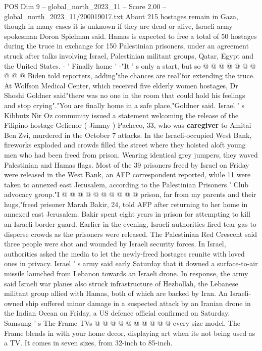 \begin{textsample}{POS Dim 9 – global\_north\_2023\_11 – Score 2.00 – global\_north\_2023\_11/200019017.txt}
About 215 hostages remain in Gaza, though in many cases it is unknown if they are dead or alive, Israeli army spokesman Doron Spielman said.
Hamas is expected to free a total of 50 hostages during the truce in exchange for 150 Palestinian prisoners, under an agreement struck after talks involving Israel, Palestinian militant groups, Qatar, Egypt and the United States. - ' Finally home ' -"It ' s only a start, but so @ @ @ @ @ @ @ @ @ @ Biden told reporters, adding"the chances are real"for extending the truce.
At Wolfson Medical Center, which received five elderly women hostages, Dr Shoshi Goldner said"there was no one in the room that could hold his feelings and stop crying"."You are finally home in a safe place,"Goldner said.
Israel ' s Kibbutz Nir Oz community issued a statement welcoming the release of the Filipino hostage Gelienor ( Jimmy ) Pacheco, 33, who was \textbf{caregiver} to Amitai Ben Zvi, murdered in the October 7 attacks.
In the Israeli-occupied West Bank, fireworks exploded and crowds filled the street where they hoisted aloft young men who had been freed from prison.
Wearing identical grey jumpers, they waved Palestinian and Hamas flags.
Most of the 39 prisoners freed by Israel on Friday were released in the West Bank, an AFP correspondent reported, while 11 were taken to annexed east Jerusalem, according to the Palestinian Prisoners ' Club advocacy group."I @ @ @ @ @ @ @ @ @ @ prison, far from my parents and their hugs,"freed prisoner Marah Bakir, 24, told AFP after returning to her home in annexed east Jerusalem.
Bakir spent eight years in prison for attempting to kill an Israeli border guard.
Earlier in the evening, Israeli authorities fired tear gas to disperse crowds as the prisoners were released.
The Palestinian Red Crescent said three people were shot and wounded by Israeli security forces.
In Israel, authorities asked the media to let the newly-freed hostages reunite with loved ones in privacy.
Israel ' s army said early Saturday that it downed a surface-to-air missile launched from Lebanon towards an Israeli drone.
In response, the army said Israeli war planes also struck infrastructure of Hezbollah, the Lebanese militant group allied with Hamas, both of which are backed by Iran.
An Israeli-owned ship suffered minor damage in a suspected attack by an Iranian drone in the Indian Ocean on Friday, a US defence official confirmed on Saturday.
Samsung ' s The Frame TVs @ @ @ @ @ @ @ @ @ @ every size model.
The Frame blends in with your home decor, displaying art when its not being used as a TV.
It comes in seven sizes, from 32-inch to 85-inch.

\end{textsample}
